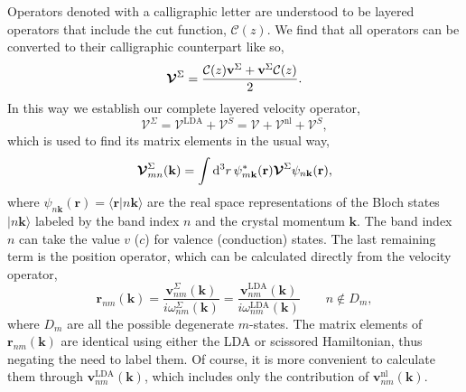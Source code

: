 \documentclass[prb,superscriptaddress,showpacs,twocolumn,letterpaper]{revtex4}
\begin{document}
Operators denoted with a calligraphic letter are understood to be layered
operators that include the cut function, $\mathcal{C}(z)$. We find that all
operators can be converted to their calligraphic counterpart like
so,\cite{andersonPRB15}
\begin{equation*}
\boldsymbol{\mathcal{V}}^{\Sigma} = 
\frac{{\mathbf{\cal C}}(z)\mathbf{v}^\Sigma + 
\mathbf{v}^\Sigma{\mathbf{\cal C}}(z)}{2}.
\end{equation*}
In this way we establish our complete layered velocity operator,
\begin{equation*}\label{eq:velop}
\boldsymbol{\mathcal{V}}^{\Sigma} =
\boldsymbol{\mathcal{V}}^{\mathrm{LDA}} + \boldsymbol{\mathcal{V}}^{S}
= \boldsymbol{\mathcal{V}} + \boldsymbol{\mathcal{V}}^{\mathrm{nl}}
+ \boldsymbol{\mathcal{V}}^{S},
\end{equation*}
which is used to find its matrix elements in the usual way,
\begin{equation*}
{\boldsymbol{\mathcal{V}}}^{\Sigma}_{mn}({\mathbf k}) = 
\int\mathrm{d}^3 r\,\psi^*_{m\mathbf{k}}(\mathbf{r})
\boldsymbol{\mathcal{\cal V}}^{\Sigma}\psi_{n\mathbf{k}}(\mathbf{r}),
\end{equation*}
where $\psi_{n\mathbf{k}}(\mathbf{r})=\langle\mathbf{r}|n\mathbf{k}\rangle$ are
the real space representations of the Bloch states $|n\mathbf{k}\rangle$ labeled
by the band index $n$ and the crystal momentum $\mathbf{k}$. The band index $n$
can take the value $v$ ($c$) for valence (conduction) states. The last remaining
term is the position operator, which can be calculated directly from the
velocity operator,
\begin{equation*}
\mathbf{r}_{nm}(\mathbf{k}) =
\frac{\mathbf{v}^\Sigma_{nm}(\mathbf{k})}{i\omega^\Sigma_{nm}(\mathbf{k})}
= \frac{\mathbf{v}^\mathrm{LDA}_{nm}(\mathbf{k})}
       {i\omega^\mathrm{LDA}_{nm}(\mathbf{k})}
\quad\quad n\notin D_{m},
\end{equation*}
where $D_m$ are all the possible degenerate $m$-states. The matrix elements of
$\mathbf{r}_{nm}(\mathbf{k})$ are identical using either the LDA or scissored
Hamiltonian,\cite{andersonPRB15} thus negating the need to label them. Of
course, it is more convenient to calculate them through
$\mathbf{v}^\mathrm{LDA}_{nm}(\mathbf{k})$, which includes only the contribution
of $\mathbf{v}^\mathrm{nl}_{nm}(\mathbf{k})$.
\end{document}
